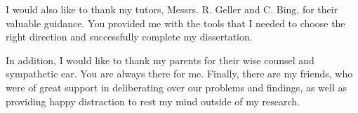 \documentclass[a4paper,12pt]{report}
\begin{document}
I would also like to thank my tutors, Messrs. R. Geller and C. Bing, for their valuable guidance. You  provided  me  with  the  tools  that  I  needed  to  choose  the  right  direction  and  successfully complete my dissertation.

In addition, I would like to thank my parents for their wise counsel and sympathetic ear. You are always there for me. Finally, there are my friends, who were of great support in deliberating over our problems and findings, as well as providing happy distraction to rest my mind outside of my research. 

\listoffigures
\listoftables



\tableofcontents















\end{document}
